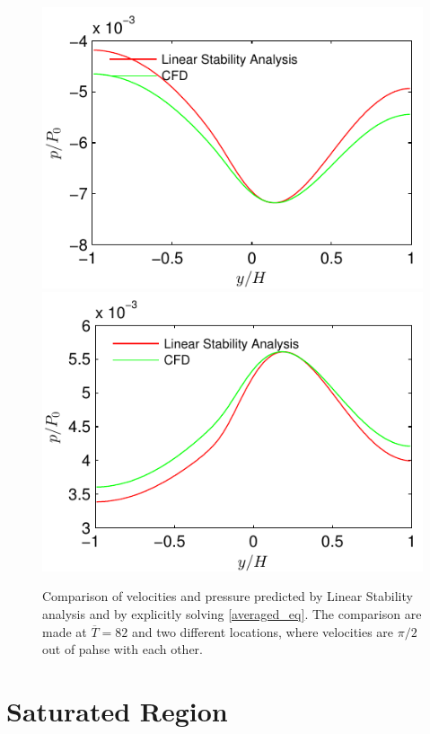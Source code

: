 \documentclass[12pt]{report}   %
\renewcommand{\bar}{\overline}
\begin{document}
\begin{figure}
\centerline{\includegraphics{LinearStabilityVsCFD_p_phase0} \includegraphics{LinearStabilityVsCFD_p_phase90}}
\caption{Comparison of velocities and pressure predicted by Linear Stability analysis and by explicitly solving \eqref{averaged_eq}. The comparison are made at $\bar{T}=82$ and two different locations, where velocities are $\pi/2$ out of pahse with each other.}
\label{CFD_vs_LinearStability_AllVariables}
\end{figure}
\clearpage{\pagestyle{empty}\cleardoublepage}

\section{Saturated Region}
\end{document}
